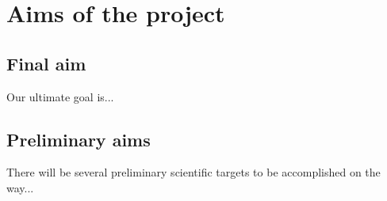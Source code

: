 
\chapter{Aims of the project} %



\section{Final aim}

Our ultimate goal is...

\section{Preliminary aims}

There will be several preliminary scientific targets to be accomplished on the way...




